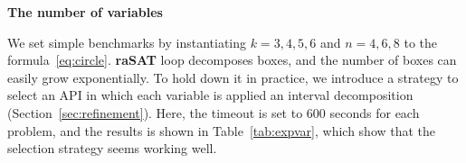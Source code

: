 \documentclass[runningheads,a4paper,oribibl]{llncs}
\newcommand{\smallHead}[1]{%
    \par\vspace{.35cm}\noindent\textbf{#1}%
    \par\noindent\ignorespaces%
}
\begin{document}
\begin{table}
\centering
{}
\caption{Experimental results for $\psi = x_1^n + x_2^n < 1 \wedge (x_1-r)^n + (x_2-r)^n <1$}
\label{tab:expdegree}
\end{table}



\smallHead{The number of variables}

We set simple benchmarks by instantiating $k=3,4,5,6$ and $n=4,6,8$ 
to the formula~\ref{eq:circle}. 
{\bf raSAT} loop decomposes boxes, and the number of boxes can easily grow 
exponentially. To hold down it in practice, we introduce a strategy to 
select an API in which each variable is applied an interval decomposition
(Section~\ref{sec:refinement}). 
Here, the timeout is set to $600$ seconds for each problem, 
and the results is shown in Table~\ref{tab:expvar}, which show that 
the selection strategy seems working well. 
\end{document}
